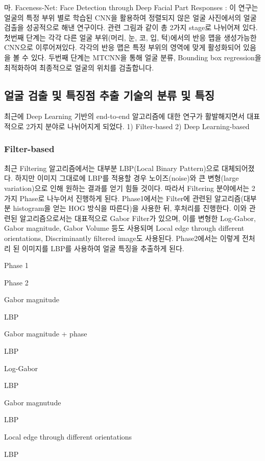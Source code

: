 \documentclass{oblivoir}
\begin{document}
마. Faceness-Net: Face Detection through Deep Facial Part Responses : 이 연구는 얼굴의 특정 부위 별로 학습된 CNN을 활용하여 정렬되지 않은 얼굴 사진에서의 얼굴 검출을 성공적으로 해낸 연구이다. 관련 그림과 같이 총 2가지 stage로 나뉘어져 있다. 첫번째 단계는 각각 다른 얼굴 부위(머리, 눈, 코, 입, 턱)에서의 반응 맵을 생성가능한 CNN으로 이루어져있다. 각각의 반응 맵은 특정 부위의 영역에 맞게 활성화되어 있음을 볼 수 있다. 두번째 단계는 MTCNN을 통해 얼굴 분류, Bounding box regression을 최적화하여 최종적으로 얼굴의 위치를 검출합니다. 

\subsection{ 얼굴 검출 및 특징점 추출 기술의 분류 및 특징 }

 최근에 Deep Learning 기반의 end-to-end 알고리즘에 대한 연구가 활발해지면서 대표적으로 2가지 분야로 나뉘어지게 되었다. 1) Filter-based 2) Deep Learning-based

\subsubsection{ Filter-based}

 최근 Filtering 알고리즘에서는 대부분 LBP(Local Binary Pattern)으로 대체되어졌다. 하지만 이미지 그대로에 LBP를 적용할 경우 노이즈(noise)와 큰 변형(large variation)으로 인해 원하는 결과를 얻기 힘들 것이다. 따라서 Filtering 분야에서는 2가지 Phase로 나누어서 진행하게 된다. Phase1에서는 Filter에 관련된 알고리즘(대부분 histogram을 얻는 HOG 방식을 따른다)을 사용한 뒤, 후처리를 진행한다. 이와 관련된 알고리즘으로서는 대표적으로 Gabor Filter가 있으며, 이를 변형한 Log-Gabor, Gabor magnitude, Gabor Volume 등도 사용되며 Local edge through different orientations, Discriminantly filtered image도 사용된다. Phase2에서는 이렇게 전처리 된 이미지를 LBP를 사용하여 얼굴 특징을 추출하게 된다.

Phase 1

Phase 2

Gabor magnitude

LBP

Gabor magnitude + phase

LBP

Log-Gabor

LBP

Gabor magnutude

LBP

Local edge through different orientations

LBP
\end{document}
